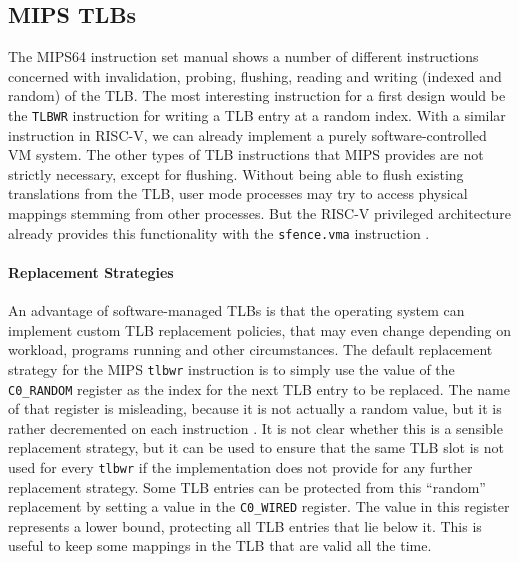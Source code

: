 \subsection{MIPS TLBs}               %


The MIPS64 instruction set manual \cite{MIPSArchitectureProgrammers2016}
shows a number of different instructions concerned with invalidation, probing, flushing, reading
and writing (indexed and random) of the TLB.
The most interesting instruction for a first design would be the \texttt{TLBWR} instruction for writing a TLB
entry at a random index. With a similar instruction in RISC-V, we can already implement a purely
software-controlled VM system.
The other types of TLB instructions that MIPS provides are not strictly necessary,
except for flushing. Without being able to flush existing translations from the TLB,
user mode processes may try to access physical mappings stemming from other processes. But the RISC-V privileged architecture already provides this functionality
with the \texttt{sfence.vma} instruction \cite{riscvreader}.


\paragraph{Replacement Strategies} An advantage of software-managed TLBs is that the operating system can implement custom
TLB replacement policies, that may even change depending on workload, programs running
and other circumstances.
The default replacement strategy for the MIPS \texttt{tlbwr} instruction is to simply
use the value of the \texttt{C0\_RANDOM} register as the index for the next TLB entry
to be replaced. The name of that register is misleading, because it is not actually a
random value, but it is rather decremented on each instruction \cite{heiserAnatomyHighPerformanceMicrokernel}.
It is not clear whether this is a sensible replacement strategy,
but it can be used to ensure that the same TLB slot is not used for every \texttt{tlbwr} if the implementation
does not provide for any further replacement strategy.
Some TLB entries can be protected from this ``random'' replacement by setting a value in the \texttt{C0\_WIRED}
register. The value in this register represents a lower bound, protecting all TLB entries that lie below it.
This is useful to keep some mappings in the TLB that are valid all the time.


